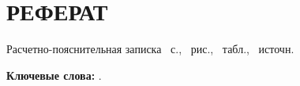 \setcounter{page}{2}
\section*{РЕФЕРАТ}
{}
Расчетно-пояснительная записка ~с., ~рис., ~табл., ~источн.


\textbf{Ключевые слова:} .



\newpage